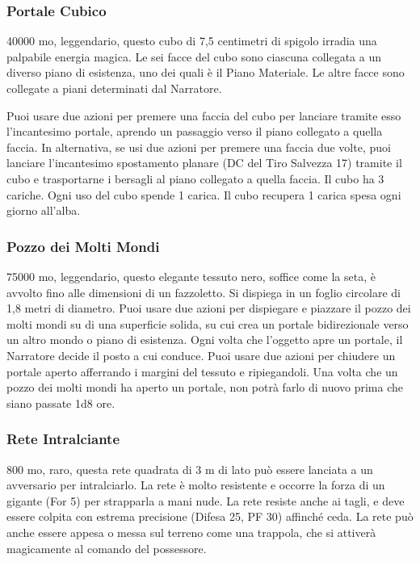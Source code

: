 \begin{multicols}{2}
\subsubsection*{Portale Cubico}
40000 mo, leggendario, questo cubo di 7,5 centimetri di spigolo irradia una palpabile energia magica. Le sei facce del cubo sono ciascuna collegata a un diverso piano di esistenza, uno dei quali è il Piano Materiale. Le altre facce sono collegate a piani determinati dal Narratore.

Puoi usare due azioni per premere una faccia del cubo per lanciare tramite esso l'incantesimo portale, aprendo un passaggio verso il piano collegato a quella faccia. In alternativa, se usi due azioni per premere una faccia due volte, puoi lanciare l'incantesimo spostamento planare (DC del Tiro Salvezza 17) tramite il cubo e trasportarne i bersagli al piano collegato a quella faccia. Il cubo ha 3 cariche. Ogni uso del cubo spende 1 carica. Il cubo recupera 1 carica spesa ogni giorno all'alba.

\subsubsection*{Pozzo dei Molti Mondi}
75000 mo, leggendario, questo elegante tessuto nero, soffice come la seta, è avvolto fino alle dimensioni di un fazzoletto. Si dispiega in un foglio circolare di 1,8 metri di diametro. Puoi usare due azioni per dispiegare e piazzare il pozzo dei molti mondi su di una superficie solida, su cui crea un portale bidirezionale verso un altro mondo o piano di esistenza. Ogni volta che l'oggetto apre un portale, il Narratore decide il posto a cui conduce. Puoi usare due azioni per chiudere un portale aperto afferrando i margini del tessuto e ripiegandoli. Una volta che un pozzo dei molti mondi ha aperto un portale, non potrà farlo di nuovo prima che siano passate 1d8 ore.

\subsubsection*{Rete Intralciante}
800 mo, raro, questa rete quadrata di 3 m di lato può essere lanciata a un avversario per intralciarlo. La rete è molto resistente e occorre la forza di un gigante (For 5) per strapparla a mani nude. La rete resiste anche ai tagli, e deve essere colpita con estrema precisione (Difesa 25, PF 30) affinché ceda. La rete può anche essere appesa o messa sul terreno come una trappola, che si attiverà magicamente al comando del possessore.


\end{multicols}
